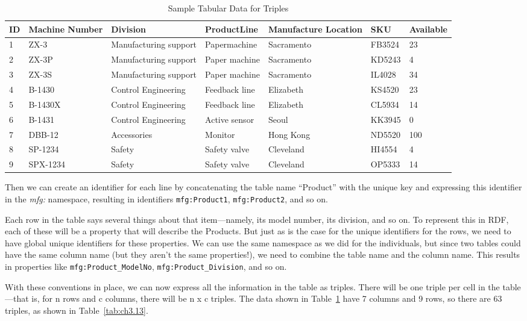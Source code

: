 \begin{challenge}
\begin{table}[h]
\centering
\begin{tabular}{||l l l l l l l ||} 
 \hline
 ID&Machine Number&Division&ProductLine&Manufacture Location&SKU&Available \\ [0.5ex] 
 \hline\hline
1&ZX-3&Manufacturing support&Papermachine&Sacramento&FB3524&23\\
2&ZX-3P&Manufacturing support&Paper machine&Sacramento&KD5243&4\\
3&ZX-3S&Manufacturing support&Paper machine&Sacramento&IL4028&34\\
4&B-1430&Control Engineering&Feedback line&Elizabeth&KS4520&23\\
5&B-1430X&Control Engineering&Feedback line&Elizabeth&CL5934&14\\
6&B-1431&Control Engineering&Active sensor&Seoul&KK3945&0\\
7&DBB-12&Accessories&Monitor&Hong Kong&ND5520&100\\
8&SP-1234&Safety&Safety valve&Cleveland&HI4554&4\\
9&SPX-1234&Safety&Safety valve&Cleveland&OP5333&14\\
\hline
\end{tabular}
\caption{Sample Tabular Data for Triples}
\label{tab:ch3.12}
\end{table}



Then we can create an identifier for each line by concatenating the
table name ``Product'' with the unique key and expressing this
identifier in the \emph{mfg:} namespace, resulting in identifiers \texttt{mfg:Product1},
\texttt{mfg:Product2}, and so on.

Each row in the table says several things about that item---namely, its
model number, its division, and so on. To represent this in RDF, each of these will be a property that will
describe the Products. But just as is the case for the unique
identifiers for the rows, we need to have global unique identifiers for
these properties. We can use the same namespace as we did for the
individuals, but since two tables could have the same column name (but
they aren't the same properties!), we need to combine the table name and
the column name. This results in properties like \texttt{mfg:Product\_ModelNo},
\texttt{mfg:Product\_Division}, and so on.

With these conventions in place, we can now express all the information
in the table as triples. There will be one triple per cell in the
table---that is, for n rows and c columns, there will be n x c triples.
The data shown in Table~\ref{tab:ch3.12} have 7 columns and 9 rows, so there are 63
triples, as shown in Table~\ref{tab:ch3.13}.


\end{challenge}
